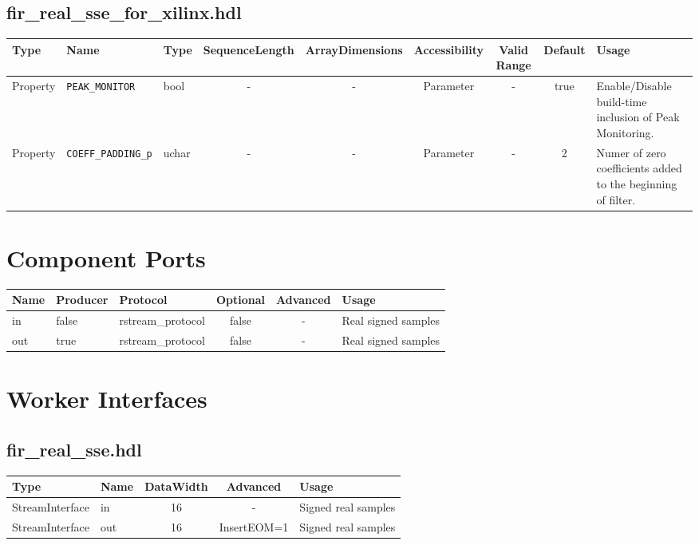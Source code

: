 \documentclass{article}
\def\comp{fir\_real\_sse}
\begin{document}
\begin{landscape}
 \subsection*{fir\_real\_sse\_for\_xilinx.hdl}
	\begin{scriptsize}
		\begin{tabular}{|p{3cm}|p{2cm}|p{1cm}|c|c|c|c|c|p{5cm}|}
			\hline
			\rowcolor{blue}
			Type     & Name                 & Type  & SequenceLength & ArrayDimensions & Accessibility       & Valid Range & Default & Usage                                        \\
			\hline
			Property & \verb+PEAK_MONITOR+ & bool & -              & -               & Parameter &  -       & true      & Enable/Disable build-time inclusion of Peak Monitoring.                            \\
               \hline
			Property & \verb+COEFF_PADDING_p+  & uchar & -              & -               & Parameter &    -   & 2      & Numer of zero coefficients added to the beginning of filter.\\
			\hline
		\end{tabular}
	\end{scriptsize}
	
	\section*{Component Ports}
	\begin{scriptsize}
		\begin{tabular}{|M{2cm}|M{1.5cm}|M{4cm}|c|c|M{9cm}|}
			\hline
			\rowcolor{blue}
			Name & Producer & Protocol          & Optional & Advanced & Usage               \\
			\hline
			in   & false    & rstream\_protocol & false    & -        & Real signed samples \\
			\hline
			out  & true     & rstream\_protocol & false    & -        & Real signed samples \\
			\hline
		\end{tabular}
	\end{scriptsize}

	\section*{Worker Interfaces}
	\subsection*{\comp.hdl}
	\begin{scriptsize}
		\begin{tabular}{|M{2cm}|M{1.5cm}|c|c|M{12cm}|}
			\hline
			Type            & Name & DataWidth & Advanced                & Usage               \\
			\hline
			StreamInterface & in   & 16   & -     & Signed real samples \\
			\hline
			StreamInterface & out  & 16   & InsertEOM=1   & Signed real samples \\
			\hline
		\end{tabular}
	\end{scriptsize}
\end{landscape}
\end{document}
